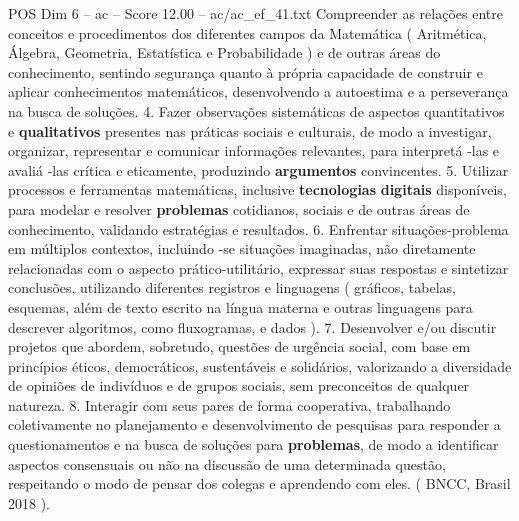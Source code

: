 \begin{textsample}{POS Dim 6 – ac – Score 12.00 – ac/ac\_ef\_41.txt}
Compreender as relações entre conceitos e procedimentos dos diferentes campos da Matemática ( Aritmética, Álgebra, Geometria, Estatística e Probabilidade ) e de outras áreas do conhecimento, sentindo segurança quanto à própria capacidade de construir e aplicar conhecimentos matemáticos, desenvolvendo a autoestima e a perseverança na busca de soluções. 4.
Fazer observações sistemáticas de aspectos quantitativos e \textbf{qualitativos} presentes nas práticas sociais e culturais, de modo a investigar, organizar, representar e comunicar informações relevantes, para interpretá -las e avaliá -las crítica e eticamente, produzindo \textbf{argumentos} convincentes. 5.
Utilizar processos e ferramentas matemáticas, inclusive \textbf{tecnologias} \textbf{digitais} disponíveis, para modelar e resolver \textbf{problemas} cotidianos, sociais e de outras áreas de conhecimento, validando estratégias e resultados. 6.
Enfrentar situações-problema em múltiplos contextos, incluindo -se situações imaginadas, não diretamente relacionadas com o aspecto prático-utilitário, expressar suas respostas e sintetizar conclusões, utilizando diferentes registros e linguagens ( gráficos, tabelas, esquemas, além de texto escrito na língua materna e outras linguagens para descrever algoritmos, como fluxogramas, e dados ). 7.
Desenvolver e/ou discutir projetos que abordem, sobretudo, questões de urgência social, com base em princípios éticos, democráticos, sustentáveis e solidários, valorizando a diversidade de opiniões de indivíduos e de grupos sociais, sem preconceitos de qualquer natureza. 8.
Interagir com seus pares de forma cooperativa, trabalhando coletivamente no planejamento e desenvolvimento de pesquisas para responder a questionamentos e na busca de soluções para \textbf{problemas}, de modo a identificar aspectos consensuais ou não na discussão de uma determinada questão, respeitando o modo de pensar dos colegas e aprendendo com eles. ( BNCC, Brasil 2018 ).

\end{textsample}
